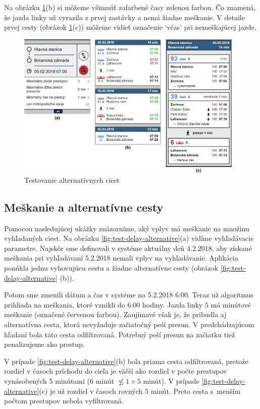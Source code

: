 Na obrázku \ref{fig:test-alternative}(b) si môžeme všimnúť zafarbené časy zelenou farbou. Čo znamená, že jazda linky už vyrazila z prvej zastávky a nemá žiadne meškanie. V detaile prvej cesty (obrázok \ref{fig:test-alternative}(c)) môžeme vidieť označenie `včas' pri nemeškajúcej jazde.

\begin{figure}[H]
\centerline{\includegraphics[width=0.97\textwidth]{images/test/alternative}}
\caption[Testovanie alternatívnych ciest]{Testovanie alternatívnych ciest}
\label{fig:test-alternative}
\end{figure}

\subsection{Meškanie a alternatívne cesty}
Pomocou nasledujúcej ukážky znázorníme, aký vplyv má meškanie na množinu vyhľadaných ciest. Na obrázku \ref{fig:test-delay-alternative}(a) vidíme vyhľadávacie parametre. Najskôr sme definovali v systéme aktuálny deň 4.2.2018, aby získané meškania pri vyhľadávaní 5.2.2018 nemali vplyv na vyhľadávanie. Aplikácia ponúkla jednu vyhovujúcu cestu a žiadne alternatívne cesty (obrázok \ref{fig:test-delay-alternative} (b)). 

Potom sme zmenili dátum a čas v systéme na 5.2.2018 6:00. Teraz už algoritmus prihliada na meškania, ktoré vznikli do 6:00 hodiny. Jazda linky $5$ má minútové meškanie (označené červenou farbou). Zaujímavé však je, že pribudla aj alternatívna cesta, ktorá nevyžaduje začiatočný peší presun. V predchádzajúcom hľadaní bola táto cesta odfiltrovaná. Potrebný peší presun na začiatku tiež penalizujeme ako prestup. 
 
V prípade \ref{fig:test-delay-alternative}(b) bola priama cesta odfiltrovaná, pretože rozdiel v časoch príchodu do cieľa je väčší ako rozdiel v počte prestupov vynásobených 5 minútami ($6$ minút $\nleq 1\times5$ minút). V prípade \ref{fig:test-delay-alternative}(c) je už rozdiel v časoch rovných $5$ minút. Preto cesta s~menším počtom prestupov nebola vyfiltrovaná.

